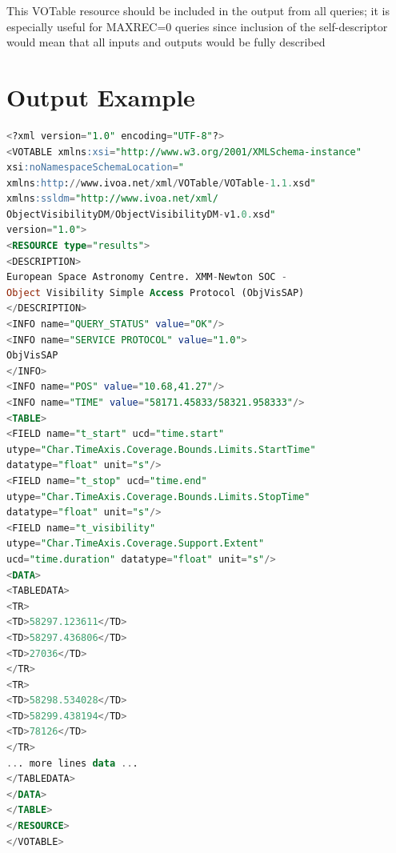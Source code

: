 \documentclass[11pt,a4paper]{ivoatex/ivoa}
\begin{document}
This VOTable resource should be included in the output from all queries;
it is especially useful for MAXREC=0 queries since inclusion of the
self-descriptor would mean that all inputs and outputs would be fully
described

\section{Output Example}
\begin{lstlisting}[language=SQL]
<?xml version="1.0" encoding="UTF-8"?>
<VOTABLE xmlns:xsi="http://www.w3.org/2001/XMLSchema-instance"
xsi:noNamespaceSchemaLocation="
xmlns:http://www.ivoa.net/xml/VOTable/VOTable-1.1.xsd"
xmlns:ssldm="http://www.ivoa.net/xml/
ObjectVisibilityDM/ObjectVisibilityDM-v1.0.xsd"
version="1.0">
<RESOURCE type="results">
<DESCRIPTION>
European Space Astronomy Centre. XMM-Newton SOC -
Object Visibility Simple Access Protocol (ObjVisSAP)
</DESCRIPTION>
<INFO name="QUERY_STATUS" value="OK"/>
<INFO name="SERVICE PROTOCOL" value="1.0">
ObjVisSAP
</INFO>
<INFO name="POS" value="10.68,41.27"/>
<INFO name="TIME" value="58171.45833/58321.958333"/>
<TABLE>
<FIELD name="t_start" ucd="time.start"
utype="Char.TimeAxis.Coverage.Bounds.Limits.StartTime"
datatype="float" unit="s"/>
<FIELD name="t_stop" ucd="time.end"
utype="Char.TimeAxis.Coverage.Bounds.Limits.StopTime"
datatype="float" unit="s"/>
<FIELD name="t_visibility"
utype="Char.TimeAxis.Coverage.Support.Extent"
ucd="time.duration" datatype="float" unit="s"/>
<DATA>
<TABLEDATA>
<TR>
<TD>58297.123611</TD>
<TD>58297.436806</TD>
<TD>27036</TD>
</TR>
<TR>
<TD>58298.534028</TD>
<TD>58299.438194</TD>
<TD>78126</TD>
</TR>
... more lines data ...
</TABLEDATA>
</DATA>
</TABLE>
</RESOURCE>
</VOTABLE>
\end{lstlisting}

\appendix
\renewcommand{\thesection}{\Alph{section}.\arabic{section}}
\setcounter{section}{0}
\end{document}
